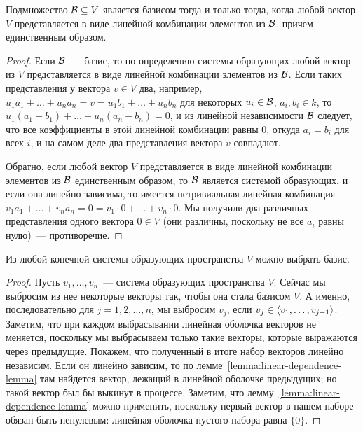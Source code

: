\begin{theorem}\label{thm:basis-equiv}
Подмножество $\mathcal B\subseteq V$ является базисом тогда и только тогда,
когда любой вектор $V$ представляется в виде линейной комбинации
элементов из $\mathcal B$, причем единственным образом.
\end{theorem}
\begin{proof}
Если $\mathcal B$~--- базис, то по определению системы образующих любой
вектор из $V$ представляется в виде линейной комбинации элементов из
$\mathcal B$. Если таких представления у вектора $v\in V$ два, например,
$u_1a_1+\dots+u_na_n = v = u_1b_1+\dots+u_nb_n$ для
некоторых $u_i\in\mathcal B$, $a_i,b_i\in k$, то
$u_1(a_1-b_1)+\dots+u_n(a_n-b_n)=0$, и из линейной
независимости $\mathcal B$ следует, что все коэффициенты в этой линейной
комбинации равны $0$, откуда $a_i=b_i$ для всех $i$, и на
самом деле два представления вектора $v$ совпадают.

Обратно, если любой вектор $V$ представляется в виде линейной
комбинации элементов из $\mathcal B$ единственным образом, то $\mathcal B$
является системой образующих, и если она линейно зависима, то имеется
нетривиальная линейная комбинация
$v_1a_1+\dots+v_na_n=0=v_1\cdot 0+\dots+v_n\cdot 0$. Мы
получили два различных представления одного вектора $0\in V$ (они
различны, поскольку не все $a_i$ равны нулю)~--- противоречие.
\end{proof}

\begin{theorem}\label{thm:spanning-list-contains-basis}
Из любой конечной системы образующих пространства $V$ можно выбрать
базис.
\end{theorem}
\begin{proof}
Пусть $v_1,\dots,v_n$~--- система образующих пространства $V$.
Сейчас мы выбросим из нее некоторые векторы так, чтобы она стала базисом $V$.
А именно, последовательно для $j=1,2,\dots,n$, мы выбросим
$v_j$, если $v_j\in\langle v_1,\dots,v_{j-1}\rangle$. Заметим, что при каждом выбрасывании
линейная оболочка векторов не меняется, поскольку мы выбрасываем только такие векторы,
которые выражаются через предыдущие. Покажем, что полученный в итоге
набор векторов линейно независим. Если он линейно зависим, то
по лемме~\ref{lemma:linear-dependence-lemma} там найдется вектор, лежащий
в линейной оболочке предыдущих; но такой вектор был бы выкинут в процессе.
Заметим, что лемму~\ref{lemma:linear-dependence-lemma} можно применить, поскольку
первый вектор в нашем наборе обязан быть ненулевым: линейная оболочка пустого
набора равна $\{0\}$.
\end{proof}

